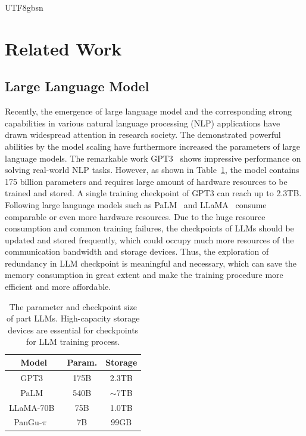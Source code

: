 \documentclass{article}
\theoremstyle{plain}
\theoremstyle{definition}
\theoremstyle{remark}
\begin{document}
\begin{CJK}{UTF8}{gbsn}
\section{Related Work}
\label{sec:related-work}



\subsection{Large Language Model}
Recently, the emergence of large language model and the corresponding strong capabilities in various natural language processing (NLP) applications have drawn widespread attention in research society. The demonstrated powerful abilities by the model scaling have furthermore increased the parameters of large language models. The remarkable work GPT3~\cite{gpt3} shows impressive performance on solving real-world NLP tasks. However, as shown in Table~\ref{table:ckpt_size}, the model contains 175 billion parameters and requires large amount of hardware resources to be trained and stored. A single training checkpoint of GPT3 can reach up to 2.3TB. Following large language models such as PaLM~\cite{palm} and LLaMA~\cite{llama} consume comparable or even more hardware resources. Due to the huge resource consumption and common training failures, the checkpoints of LLMs should be updated and stored frequently, which could occupy much more resources of the communication bandwidth and storage devices. Thus, the exploration of redundancy in LLM checkpoint is meaningful and necessary, which can save the memory consumption in great extent and make the training procedure more efficient and more affordable.

\begin{table}[t]
	\vspace{-5pt}
	\caption{The parameter and checkpoint size of part LLMs. High-capacity storage devices are essential for checkpoints for LLM training process.}
	\centering
	\begin{tabular}{c|c|c}
		\toprule
		Model & Param. & Storage   \\ \midrule
		GPT3~\cite{gpt3} &  175B       &      2.3TB   \\  %
		PaLM~\cite{palm} &  540B       &       $\sim$7TB    \\  %
		LLaMA-70B~\cite{llama} &  75B       &       1.0TB   \\  %
		PanGu-$\pi$ ~\cite{wangpangu} &  7B       &       99GB   \\  \bottomrule
	\end{tabular}
	\label{table:ckpt_size}
	\vspace{-7mm}
\end{table}


\end{CJK}
\end{document}
